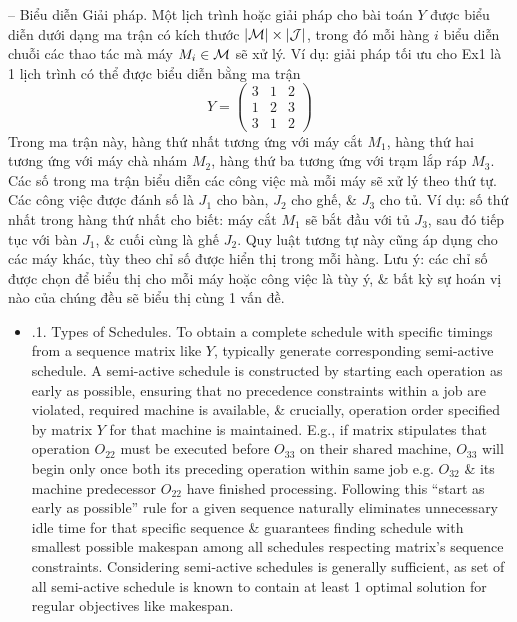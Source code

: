 \documentclass{article}
\begin{document}
\begin{itemize}
\begin{itemize}
        -- {\sf Biểu diễn Giải pháp.} Một lịch trình hoặc giải pháp cho bài toán $Y$ được biểu diễn dưới dạng ma trận có kích thước $|{\cal M}|\times|{\cal J}|$, trong đó mỗi hàng $i$ biểu diễn chuỗi các thao tác mà máy $M_i\in{\cal M}$ sẽ xử lý. Ví dụ: giải pháp tối ưu cho Ex1 là 1 lịch trình có thể được biểu diễn bằng ma trận
        \begin{equation*}
            Y = \begin{pmatrix}
                3 & 1 & 2\\1 & 2 & 3\\3 & 1 & 2
            \end{pmatrix}
        \end{equation*}
        Trong ma trận này, hàng thứ nhất tương ứng với máy cắt $M_1$, hàng thứ hai tương ứng với máy chà nhám $M_2$, hàng thứ ba tương ứng với trạm lắp ráp $M_3$. Các số trong ma trận biểu diễn các công việc mà mỗi máy sẽ xử lý theo thứ tự. Các công việc được đánh số là $J_1$ cho bàn, $J_2$ cho ghế, \& $J_3$ cho tủ. Ví dụ: số thứ nhất trong hàng thứ nhất cho biết: máy cắt $M_1$ sẽ bắt đầu với tủ $J_3$, sau đó tiếp tục với bàn $J_1$, \& cuối cùng là ghế $J_2$. Quy luật tương tự này cũng áp dụng cho các máy khác, tùy theo chỉ số được hiển thị trong mỗi hàng. Lưu ý: các chỉ số được chọn để biểu thị cho mỗi máy hoặc công việc là tùy ý, \& bất kỳ sự hoán vị nào của chúng đều sẽ biểu thị cùng 1 vấn đề.
        \begin{itemize}
            \item {.1. Types of Schedules.} To obtain a complete schedule with specific timings from a sequence matrix like $Y$, typically generate corresponding semi-active schedule. A semi-active schedule is constructed by starting each operation as early as possible, ensuring that no precedence constraints within a job are violated, required machine is available, \& crucially, operation order specified by matrix $Y$ for that machine is maintained. E.g., if matrix stipulates that operation $O_{22}$ must be executed before $O_{33}$ on their shared machine, $O_{33}$ will begin only once both its preceding operation within same job e.g. $O_{32}$ \& its machine predecessor $O_{22}$ have finished processing. Following this ``start as early as possible'' rule for a given sequence naturally eliminates unnecessary idle time for that specific sequence \& guarantees finding schedule with smallest possible makespan among all schedules respecting matrix's sequence constraints. Considering semi-active schedules is generally sufficient, as set of all semi-active schedule is known to contain at least 1 optimal solution for regular objectives like makespan.


\end{itemize}
\end{itemize}
\end{itemize}
\end{document}
